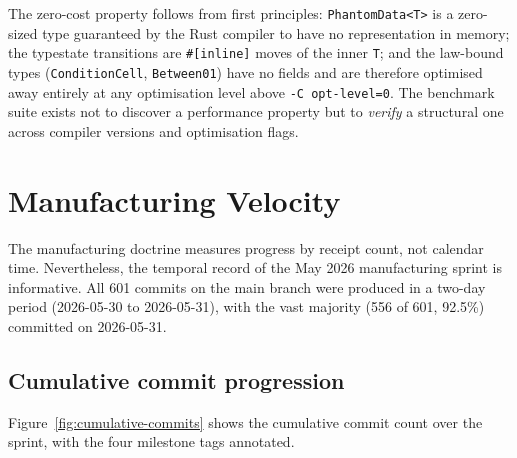 The zero-cost property follows from first principles: \texttt{PhantomData<T>}
is a zero-sized type guaranteed by the Rust compiler to have no representation
in memory; the typestate transitions are \texttt{\#[inline]} moves of the inner
\texttt{T}; and the law-bound types (\texttt{ConditionCell}, \texttt{Between01})
have no fields and are therefore optimised away entirely at any optimisation
level above \texttt{-C opt-level=0}. The benchmark suite exists not to discover
a performance property but to \emph{verify} a structural one across compiler
versions and optimisation flags.

\section{Manufacturing Velocity}
\label{sec:crown-velocity}

The manufacturing doctrine measures progress by receipt count, not calendar
time. Nevertheless, the temporal record of the May 2026 manufacturing sprint
is informative. All 601 commits on the main branch were produced in a two-day
period (2026-05-30 to 2026-05-31), with the vast majority (556 of 601, 92.5\%)
committed on 2026-05-31.

\subsection{Cumulative commit progression}
\label{ssec:crown-cumulative}

Figure~\ref{fig:cumulative-commits} shows the cumulative commit count over the
sprint, with the four milestone tags annotated.


